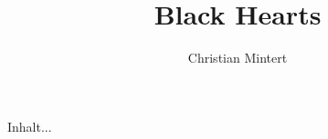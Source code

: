 \documentclass [a4paper,twocolumn] {book}
\title{Black Hearts}
\author{Christian Mintert}
\begin{document}
	\maketitle
	Inhalt...
\end{document}
